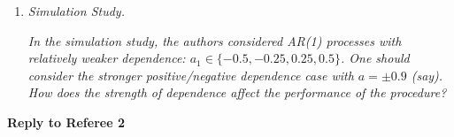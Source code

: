 \documentclass[a4paper,12pt]{article}
\begin{document}
\begin{enumerate}[label=(\arabic*),leftmargin=0.8cm]
\item \textit{Simulation Study.}

\textit{In the simulation study, the authors considered AR(1) processes with relatively weaker dependence: $a_1 \in \{-0.5, -0.25, 0.25, 0.5\}$. One should consider the \linebreak stronger positive/negative dependence case with $a = \pm 0.9$ (say). How does the strength of dependence affect the performance of the procedure?}

\end{enumerate}



\newpage
\begin{center}
{\large \bf Reply to Referee 2} 
\end{center}
\end{document}

